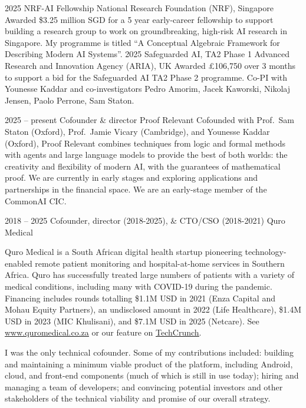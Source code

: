 \documentclass[9pt]{developercv} %
\begin{document}
\begin{entrylist}
    \entry
    {2025}
    {NRF-AI Fellowship }
    {National Research Foundation (NRF), Singapore}
    {Awarded \$3.25 million SGD for a 5 year early-career fellowship to support building a research group to work on groundbreaking, high-risk AI research in Singapore. My programme is titled ``A Conceptual Algebraic Framework for Describing Modern AI Systems''.}
    \entry
    {2025}
    {Safeguarded AI, TA2 Phase 1 }
    {Advanced Research and Innovation Agency (ARIA), UK}
    {Awarded £106,750 over 3 months to support a bid for the Safeguarded AI TA2 Phase 2 programme. Co-PI with Younesse Kaddar and co-investigators Pedro Amorim, Jacek Kaworski, Nikolaj Jensen, Paolo Perrone, Sam Staton.}
\end{entrylist}


\begin{entrylist}
    \entry
        {2025 -- present}
        {Cofounder \& director}
        {Proof Relevant}
        {Cofounded with Prof.\ Sam Staton (Oxford), Prof.\ Jamie Vicary (Cambridge), and Younesse Kaddar (Oxford), Proof Relevant combines techniques from logic and formal methods with agents and large language models to provide the best of both worlds: the creativity and flexibility of modern AI, with the guarantees of mathematical proof. We are currently in early stages and exploring applications and partnerships in the financial space. We are an early-stage member of the CommonAI CIC.}

    \entry
        {2018 -- 2025}%
        {Cofounder, director (2018-2025), \& CTO/CSO (2018-2021)}
        {Quro Medical}
        {Quro Medical is a South African digital health startup pioneering technology-enabled remote patient monitoring and hospital-at-home services in Southern Africa.
        Quro has successfully treated large numbers of patients with a variety of medical conditions, including many with COVID-19 during the pandemic.
        Financing includes rounds totalling \$1.1M USD in 2021 (Enza Capital and Mohau Equity Partners), an undisclosed amount in 2022 (Life Healthcare), \$1.4M USD in 2023 (MIC Khulisani), and \$7.1M USD in 2025 (Netcare).
        See \underline{\href{https://www.quromedical.co.za}{www.quromedical.co.za}} or our feature on \underline{\href{https://techcrunch.com/2021/04/14/south-africas-quro-medical-comes-out-of-stealth-with-1-1m-to-expand-its-hospital-at-home-service/}{TechCrunch}}.

        \vspace{1em}
        I was the only technical cofounder.
        Some of my contributions included: building and maintaining a minimum viable product of the platform, including Android, cloud, and front-end components (much of which is still in use today); hiring and managing a team of developers; and convincing potential investors and other stakeholders of the technical viability and promise of our overall strategy.}
\end{entrylist}
\end{document}
